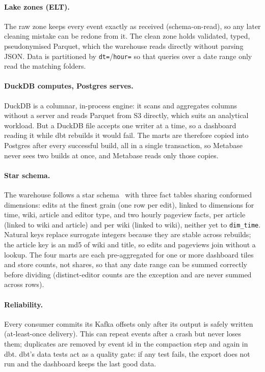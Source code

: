 \paragraph{Lake zones (ELT).} The raw zone keeps every event exactly as received (schema-on-read), so
any later cleaning mistake can be redone from it. The clean zone holds validated, typed, pseudonymised
Parquet, which the warehouse reads directly without parsing JSON. Data is partitioned by
\texttt{dt=}/\texttt{hour=} so that queries over a date range only read the matching folders.

\paragraph{DuckDB computes, Postgres serves.} DuckDB is a columnar, in-process engine: it scans and
aggregates columns without a server and reads Parquet from S3
directly, which suits an analytical workload. But a DuckDB file accepts one writer at a time, so a
dashboard reading it while dbt rebuilds it would fail. The marts are therefore copied into Postgres
after every successful build, all in a single transaction, so Metabase never sees two builds at once,
and Metabase reads only those copies.

\paragraph{Star schema.} The warehouse follows a star schema~\cite{kimball2013toolkit} with three fact tables
sharing conformed dimensions: edits at the finest grain (one row per edit), linked to dimensions for time, wiki,
article and editor type, and two hourly pageview facts, per article (linked to wiki and article) and per wiki
(linked to wiki), neither yet to \texttt{dim\_time}. Natural keys replace surrogate integers because they are
stable across rebuilds; the article key is an md5 of wiki and title, so edits and pageviews join without a lookup. The four marts are each pre-aggregated for one or more dashboard tiles and store counts, not shares,
so that any date range can be summed correctly before dividing (distinct-editor counts are the
exception and are never summed across rows).

\paragraph{Reliability.} Every consumer commits its Kafka offsets only after its output is safely
written (at-least-once delivery). This can repeat events after a crash but never loses them; duplicates
are removed by event id in the compaction step and again in dbt. dbt's data tests act as a quality gate:
if any test fails, the export does not run and the dashboard keeps the last good data.

